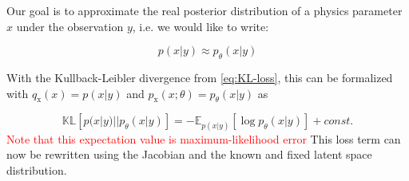 
Our goal is to approximate the real posterior distribution of a physics parameter $x$ under the observation $y$, i.e. we would like to write:

\begin{equation*}
	p(x | y) \approx p_\theta(x | y)
\end{equation*}

With the Kullback-Leibler divergence from \ref{eq:KL-loss}, this can be formalized with $q_\text{x}(x) = p(x | y)$ and $p_\text{x}(x; \theta) = p_\theta(x | y)$ as

\begin{equation*}
	\mathbb{KL}\left[p(x | y) || p_\theta(x | y) \right] = - \mathbb{E}_{p(x | y)} \left[ \log p_\theta(x | y)\right] + const.
\end{equation*}
\textcolor{red}{Note that this expectation value is maximum-likelihood error}
This loss term can now be rewritten using the Jacobian and the known and fixed latent space distribution.
